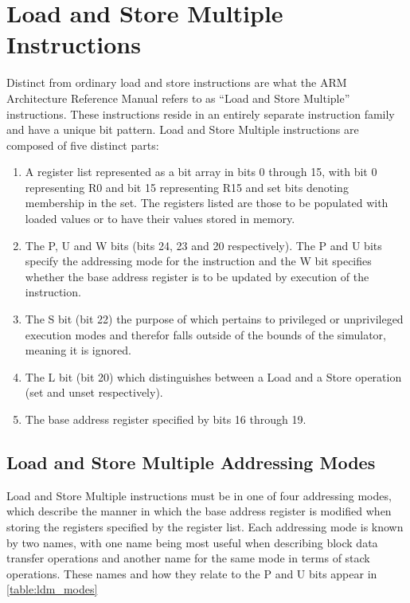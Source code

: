 \section{Load and Store Multiple Instructions}

Distinct from ordinary load and store instructions are what the ARM Architecture Reference Manual refers to as ``Load and Store Multiple'' instructions\citep[pp. A3-26]{armarm:2005}. These instructions reside in an entirely separate instruction family and have a unique bit pattern. Load and Store Multiple instructions are composed of five distinct parts:

\begin{enumerate}
    \item A register list represented as a bit array in bits 0 through 15, with bit 0 representing R0 and bit 15 representing R15 and set bits denoting membership in the set. The registers listed are those to be populated with loaded values or to have their values stored in memory.
    \item The P, U and W bits (bits 24, 23 and 20 respectively). The P and U bits specify the addressing mode for the instruction and the W bit specifies whether the base address register is to be updated by execution of the instruction.
    \item The S bit (bit 22) the purpose of which pertains to privileged or unprivileged execution modes and therefor falls outside of the bounds of the simulator, meaning it is ignored.
    \item The L bit (bit 20) which distinguishes between a Load and a Store operation (set and unset respectively).
    \item The base address register specified by bits 16 through 19.
\end{enumerate}

\subsection{Load and Store Multiple Addressing Modes}

Load and Store Multiple instructions must be in one of four addressing modes, which describe the manner in which the base address register is modified when storing the registers specified by the register list. Each addressing mode is known by two names, with one name being most useful when describing block data transfer operations and another name for the same mode in terms of stack operations. These names and how they relate to the P and U bits appear in \autoref{table:ldm_modes}

